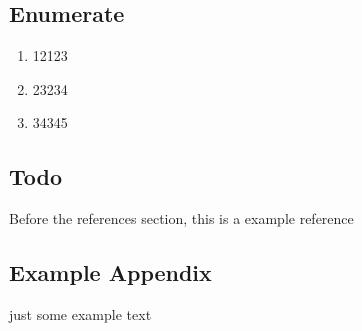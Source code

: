 \documentclass{article}
\begin{document}
\subsection{Enumerate}

\begin{enumerate}
	\item 12123
	\item 23234
	\item 34345
\end{enumerate}

\subsection{Todo}



Before the references section, this is a example reference\cite{craig2004quantum}






\newpage

\begin{appendices}

\section{Example Appendix}

just some example text

\end{appendices}
\end{document}
